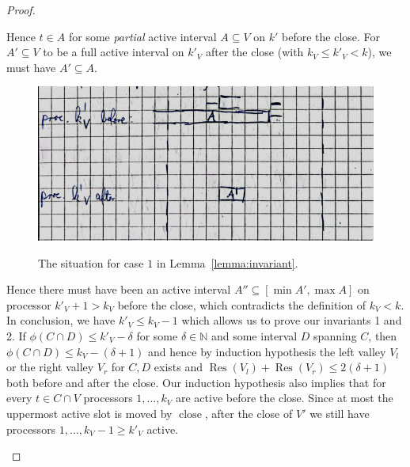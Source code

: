\documentclass[a4paper]{article}
\DeclareMathOperator{\close}{close}
\DeclareMathOperator{\res}{Res}
\begin{document}
\begin{proof}
\begin{description}
      Hence $t \in A$ for some  \emph{partial} active interval $A \subseteq V$ on $k'$ before the close.
      For $A' \subseteq V$ to be a full active interval on $k'_V$ after the close (with $k_V \leq k'_V < k$), we must have $A' \subseteq A$.
      \begin{figure}[H]
        \centering
        \includegraphics[width=\textwidth]{graphics/sketches/invariant_case1.png}\label{fig:invariant_case1}
        \caption{The situation for case $1$ in Lemma~\ref{lemma:invariant}.}
      \end{figure}
      Hence there must have been an active interval $A'' \subseteq [\min A', \max A]$ on processor $k'_V + 1 > k_V$ before the close, which contradicts the definition of $k_V < k$.
      In conclusion, we have $k'_V \leq k_V - 1$ which allows us to prove our invariants 1 and 2.
      If $\phi(C \cap D) \leq k'_{V} - \delta$ for some $\delta \in \mathbb{N}$ and some interval $D$ spanning $C$, then $\phi(C \cap D) \leq k_V - (\delta + 1)$ and hence by induction hypothesis the left valley $V_l$ or the right valley $V_r$ for $C, D$ exists and $\res(V_l) + \res(V_r) \leq 2 (\delta + 1)$ both before and after the close.
      Our induction hypothesis also implies that for every $t \in C \cap V$ processors $1, \ldots, k_V$ are active before the close.
      Since at most the uppermost active slot is moved by $\close$, after the close of $V'$ we still have processors $1, \ldots, k_V - 1 \geq k'_V$ active.


\end{description}
\end{proof}
\end{document}
